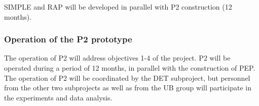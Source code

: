 
SIMPLE and RAP will be developed in parallel with P2 construction (12 months).  

\subsubsection*{Operation of the P2 prototype}
The operation of P2 will address objectives 1-4 of the project. P2 will be operated during a period of 12 months, in parallel with the construction of PEP. The operation of P2 will be coordinated by the DET subproject, but personnel from the other two subprojects as well as from the UB group will participate in the experiments and data analysis. 

